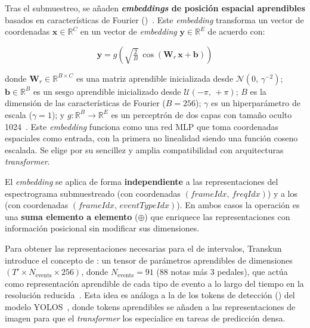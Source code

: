 \documentclass[11pt,spanish,listoffigures,listoftables]{tfgetsinf}
\begin{document}
Tras el submuestreo, se añaden \textbf{\textit{embeddings} de posición espacial aprendibles}
basados en características de Fourier ()~\cite{li2021fourier}. Este \textit{embedding} transforma un vector de coordenadas
$\boldsymbol{x} \in \mathbb{R}^C$ en un vector de \textit{embedding}
$\boldsymbol{y} \in \mathbb{R}^E$ de acuerdo con:

\begin{equation}
  \boldsymbol{y} = g\!\left(\sqrt{\tfrac{2}{B}}\,
  \cos(\boldsymbol{W}_r\,\boldsymbol{x} + \boldsymbol{b})\right)
  \label{eq:fourier_pos}
\end{equation}

\noindent donde $\boldsymbol{W}_r \in \mathbb{R}^{B \times C}$ es una matriz
aprendible inicializada desde $\mathcal{N}(0,\,\gamma^{-2})$;
$\boldsymbol{b} \in \mathbb{R}^B$ es un sesgo aprendible inicializado desde
$\mathcal{U}(-\pi,\,+\pi)$; $B$ es la dimensión de las características de Fourier
($B = 256$); $\gamma$ es un hiperparámetro de escala ($\gamma = 1$); y
$g : \mathbb{R}^B \to \mathbb{R}^E$ es un perceptrón de dos capas con tamaño
oculto 1024~\cite{yan2024transkun}. Este \textit{embedding} funciona como una red MLP que
toma coordenadas espaciales como entrada, con la primera no linealidad siendo una
función coseno escalada. Se elige por su sencillez y amplia compatibilidad con
arquitecturas \textit{transformer}.

El \textit{embedding} se aplica de forma \textbf{independiente} a las representaciones del
espectrograma submuestreado (con coordenadas $(\textit{frameIdx},\,
\textit{freqIdx})$) y a los  (con coordenadas
$(\textit{frameIdx},\, \textit{eventTypeIdx})$). En ambos casos la operación es
una \textbf{suma elemento a elemento} ($\oplus$) que enriquece las representaciones con
información posicional sin modificar sus dimensiones.


Para obtener las representaciones necesarias para el 
de intervalos, Transkun introduce el concepto de
\textbf{}: un tensor de parámetros aprendibles de
dimensiones $(T' \times N_{\text{events}} \times 256)$, donde
$N_{\text{events}} = 91$ (88 notas más 3 pedales), que actúa como representación
aprendible de cada tipo de evento a lo largo del tiempo en la resolución reducida~\cite{yan2024transkun}.
Esta idea es análoga a la de los tokens de detección () del modelo YOLOS~\cite{fang2021yolos}, donde tokens aprendibles se
añaden a las representaciones de imagen para que el \textit{transformer} los especialice
en tareas de predicción densa.
\end{document}
